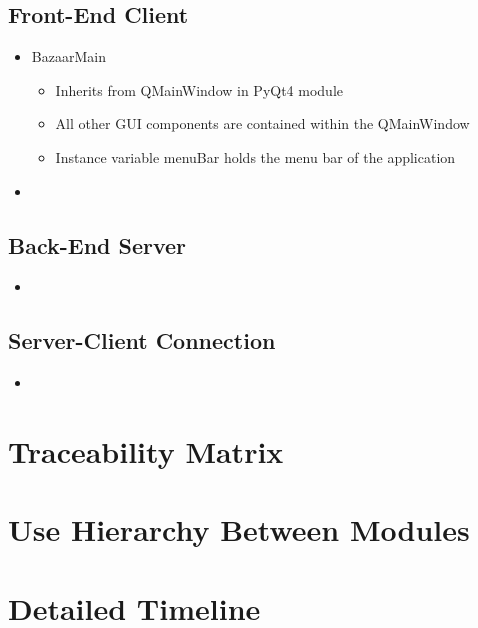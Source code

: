 \documentclass{article}
\begin{document}
\subsection*{Front-End Client}
\begin{itemize}
\item
BazaarMain

\begin{itemize}
\item
Inherits from QMainWindow in PyQt4 module

\item
All other GUI components are contained within the QMainWindow

\item
Instance variable menuBar holds the menu bar of the application
\end{itemize}

\item
\end{itemize}


\subsection*{Back-End Server}
\begin{itemize}
\item

\end{itemize}

\subsection*{Server-Client Connection}
\begin{itemize}
\item

\end{itemize}

\section*{Traceability Matrix}

\section*{Use Hierarchy Between Modules}

\section*{Detailed Timeline}
\end{document}
